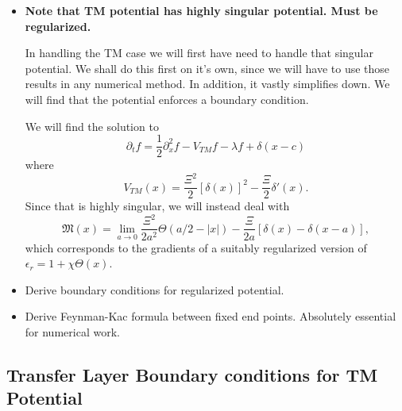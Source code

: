 \begin{itemize}
  \item \textbf{Note that TM potential has highly singular potential.  Must be regularized.}

In handling the TM case we will first have need to handle that singular potential.
 We shall do this first on it's own, since we will have to use those results in any numerical method.
 In addition, it vastly simplifies down.
 We will find that the potential enforces a boundary condition.  

We will find the solution to 
\begin{equation}
\partial_t f = \frac{1}{2}\partial_x^2f -V_{TM} f - \lambda f + \delta(x-c)
\end{equation}
where 
\begin{equation}
V_{TM}(x) = \frac{\Xi^2}{2}[\delta(x)]^2 - \frac{\Xi}{2}\delta'(x).
\end{equation}
Since that is highly singular, we will instead deal with 
\begin{equation}
\mathfrak{M}(x) = \lim_{a\rightarrow 0} \frac{\Xi^2}{2a^2}\Theta(a/2-|x|) - \frac{\Xi}{2a}[\delta(x)-\delta(x-a)],
\end{equation}
which corresponds to the gradients of a suitably regularized version of $\epsilon_r = 1+\chi\Theta(x)$.  

  \item Derive boundary conditions for regularized potential.  
  \item Derive Feynman-Kac formula between fixed end points.  Absolutely essential for numerical
    work.
\end{itemize}


\subsection{Transfer Layer Boundary conditions for TM Potential}

